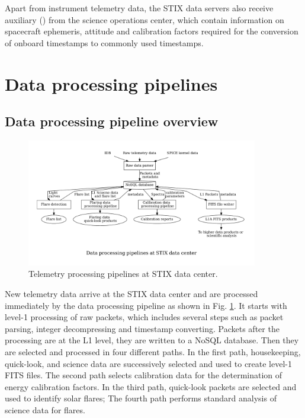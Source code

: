 \documentclass[referee]{aa} %
\begin{document}
Apart from instrument telemetry data, the STIX data servers also receive
  auxiliary (\cite{spice1996,spice2018})  from the science operations center,
which contain information on spacecraft ephemeris, attitude and  
calibration factors required for the conversion of onboard timestamps 
to commonly used timestamps. 


\section{Data processing pipelines}
\subsection{Data processing pipeline overview}


\begin{figure}
    \centering
    \includegraphics[width=0.9\textwidth]{figures/pipelines.pdf}
    \caption{Telemetry processing pipelines at STIX data center.}
    \label{fig:main_pipelines}
\end{figure}
New telemetry data arrive at the STIX data center and are processed immediately by the data processing pipeline  
as shown in Fig. \ref{fig:main_pipelines}. 
It starts with level-1 processing of raw packets, which includes several steps such as  packet parsing, 
integer decompressing and timestamp converting. 
Packets after the processing are at the L1 level, they are written to a NoSQL database. 
Then they are selected and processed in four different paths. 
In the first path,  housekeeping, quick-look, and science data are successively selected and 
used to create level-1 FITS files. The second path selects calibration data for the determination
 of energy calibration factors. 
 In the third path, quick-look packets are selected and used to identify solar
flares; The fourth path performs standard analysis of science data for flares.
\end{document}
